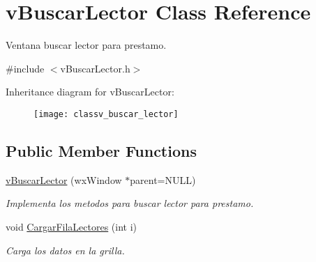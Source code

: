 \hypertarget{classv_buscar_lector}{}\section{v\+Buscar\+Lector Class Reference}
\label{classv_buscar_lector}


Ventana buscar lector para prestamo.  




{\ttfamily \#include $<$v\+Buscar\+Lector.\+h$>$}

Inheritance diagram for v\+Buscar\+Lector\+:\begin{figure}[H]
\begin{center}
\leavevmode
\texttt{[image: classv\_buscar\_lector]}
\end{center}
\end{figure}
\subsection*{Public Member Functions}
\begin{DoxyCompactItemize}
\item 
\hyperlink{classv_buscar_lector_aa7c55a55519cd7a80bac7eeeba2bd1f2}{v\+Buscar\+Lector} (wx\+Window $\ast$parent=N\+U\+LL)\hypertarget{classv_buscar_lector_aa7c55a55519cd7a80bac7eeeba2bd1f2}{}\label{classv_buscar_lector_aa7c55a55519cd7a80bac7eeeba2bd1f2}

\begin{DoxyCompactList}\small\item\em Implementa los metodos para buscar lector para prestamo. \end{DoxyCompactList}\item 
void \hyperlink{classv_buscar_lector_a3d7e7d73baab3bac2e7d5468409fd3bc}{Cargar\+Fila\+Lectores} (int i)\hypertarget{classv_buscar_lector_a3d7e7d73baab3bac2e7d5468409fd3bc}{}\label{classv_buscar_lector_a3d7e7d73baab3bac2e7d5468409fd3bc}

\begin{DoxyCompactList}\small\item\em Carga los datos en la grilla. \end{DoxyCompactList}\end{DoxyCompactItemize}
